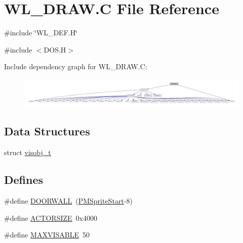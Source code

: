 \hypertarget{WL__DRAW_8C}{
\section{WL\_\-DRAW.C File Reference}
\label{WL__DRAW_8C}
}
{\ttfamily \#include \char`\"{}WL\_\-DEF.H\char`\"{}}\par
{\ttfamily \#include $<$DOS.H$>$}\par
Include dependency graph for WL\_\-DRAW.C:
\nopagebreak
\begin{figure}[H]
\begin{center}
\leavevmode
\includegraphics[width=400pt]{WL__DRAW_8C__incl}
\end{center}
\end{figure}
\subsection*{Data Structures}
\begin{DoxyCompactItemize}
\item 
struct \hyperlink{structvisobj__t}{visobj\_\-t}
\end{DoxyCompactItemize}
\subsection*{Defines}
\begin{DoxyCompactItemize}
\item 
\#define \hyperlink{WL__DRAW_8C_ad3c307258ea9f6baf1ba1ded7ef64980}{DOORWALL}~(\hyperlink{ID__PM_8H_ac15156742487c3e546be66ffc29b4473}{PMSpriteStart}-\/8)
\item 
\#define \hyperlink{WL__DRAW_8C_a5241aa529d371f6858d3489da2d83bcb}{ACTORSIZE}~0x4000
\item 
\#define \hyperlink{WL__DRAW_8C_a26a0e29fe930734d196b009afde30d66}{MAXVISABLE}~50
\end{DoxyCompactItemize}
